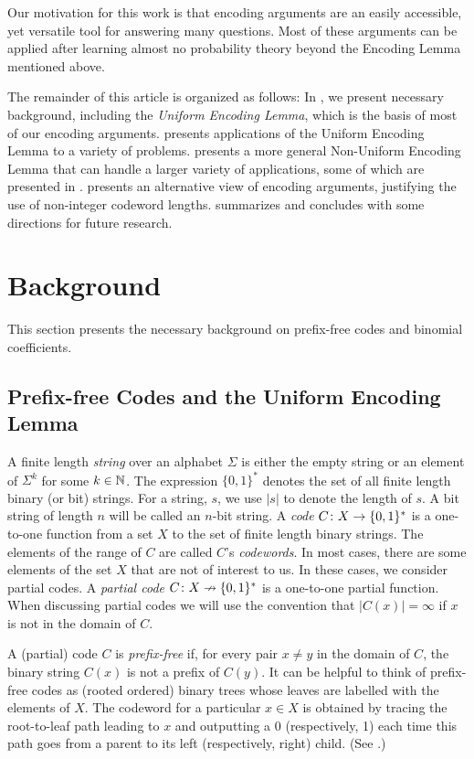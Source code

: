 \documentclass{patmorin}
\begin{document}
Our motivation for this work is that encoding arguments are an easily
accessible, yet versatile tool for answering many questions.  Most of
these arguments can be applied after learning almost no probability
theory beyond the Encoding Lemma mentioned above.

The remainder of this article is organized as follows: In
, we present necessary background, including the
\emph{Uniform Encoding Lemma}, which is the basis of most of our
encoding arguments.   presents applications of
the Uniform Encoding Lemma to a variety of problems.  
presents a more general Non-Uniform Encoding Lemma that can handle a
larger variety of applications, some of which are presented in
.   presents an alternative view of
encoding arguments, justifying the use of non-integer codeword
lengths.   summarizes and concludes with some
directions for future research.

\section{Background}

This section presents the necessary background on prefix-free codes
and binomial coefficients.

\subsection{Prefix-free Codes and the Uniform Encoding Lemma}

A finite length \emph{string} over an alphabet $\Sigma$ is either the
empty string or an element of $\Sigma^k$ for some $k \in \mathbb{N}$. The
expression $\{0, 1\}^*$ denotes the set of all finite length binary
(or bit) strings. For a string, $s$, we use $|s|$ to denote the length of
$s$.  A bit string of length $n$ will be called an $n$-bit
string. A \emph{code} $C\colon X\to \{0,1\}^*$ is a one-to-one function
from a set $X$ to the set of finite length binary strings.  The
elements of the range of $C$ are called $C$'s \emph{codewords}.  In
most cases, there are some elements of the set $X$ that are not of
interest to us.  In these cases, we consider partial codes. A
\emph{partial code} $C\colon X\nrightarrow \{0,1\}^*$ is a one-to-one
partial function.  When discussing partial codes we will use the
convention that $|C(x)|=\infty$ if $x$ is not in the domain of $C$.

A (partial) code $C$ is \emph{prefix-free} if, for every pair
$x\neq y$ in the domain of $C$, the binary string $C(x)$ is not a
prefix of $C(y)$.  It can be helpful to think of prefix-free codes as
(rooted ordered) binary trees whose leaves are labelled with the
elements of $X$.  The codeword for a particular $x\in X$ is obtained
by tracing the root-to-leaf path leading to $x$ and outputting a 0
(respectively, 1) each time this path goes from a parent to its left
(respectively, right) child. (See .)
\end{document}
